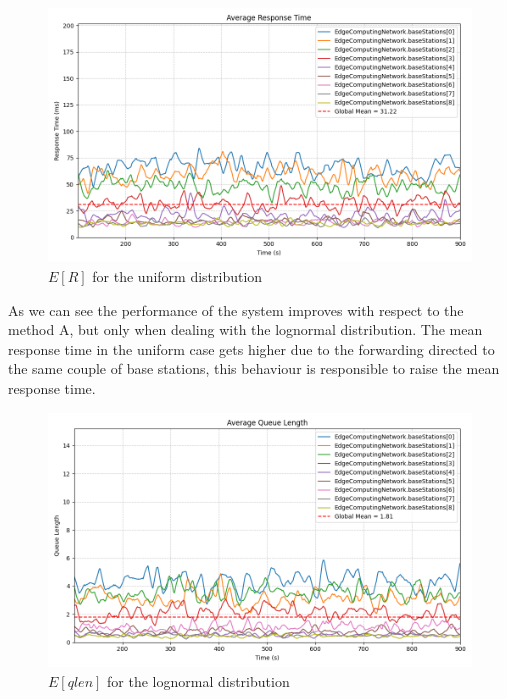\documentclass{report}
\begin{document}
\begin{figure}[H]
    \centering
    \includegraphics[width=\textwidth]{img/plots/uni_1e3_B/resptime.png}
    \caption{$E[R]$ for the uniform distribution}
\end{figure}

As we can see the performance of the system improves with respect to the method A, but only when dealing with the lognormal distribution. The mean response time in the uniform case gets higher due to the forwarding directed to the same couple of base stations, this behaviour is responsible to raise the mean response time.

\begin{figure}[H]
    \centering
    \includegraphics[width=\textwidth]{img/plots/log_1e3_B/qlen.png}
    \caption{$E[qlen]$ for the lognormal distribution}
\end{figure}
\end{document}
